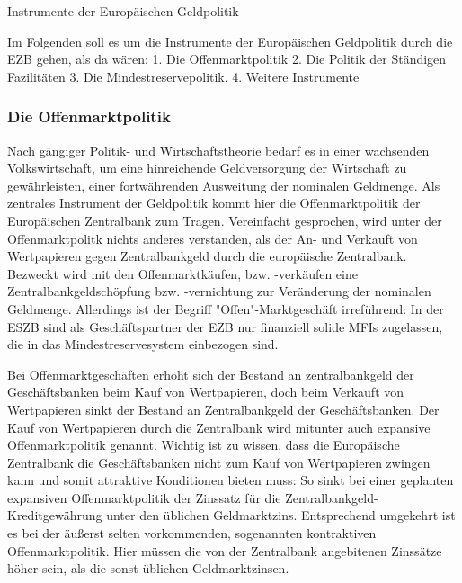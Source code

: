\documentclass[
onecolumn,
a4paper,
abstracton,
parskip=half
,final
]{scrartcl}
\begin{document}
Instrumente der Europ{\"a}ischen Geldpolitik

Im Folgenden soll es um die Instrumente der Europ{\"a}ischen Geldpolitik durch die EZB gehen, als da w{\"a}ren:
1. Die Offenmarktpolitik
2. Die Politik der St{\"a}ndigen Fazilit{\"a}ten
3. Die Mindestreservepolitik.
4. Weitere Instrumente

\subsubsection{Die Offenmarktpolitik}
Nach g{\"a}ngiger Politik- und Wirtschaftstheorie bedarf es in einer wachsenden Volkswirtschaft, um eine hinreichende Geldversorgung der Wirtschaft zu gew{\"a}hrleisten, einer fortw{\"a}hrenden Ausweitung der nominalen Geldmenge. Als zentrales Instrument der Geldpolitik kommt hier die Offenmarktpolitik der Europ{\"a}ischen Zentralbank zum Tragen.
Vereinfacht gesprochen, wird unter der Offenmarktpolitk nichts anderes verstanden, als der An- und Verkauft von Wertpapieren gegen Zentralbankgeld durch die europ{\"a}ische Zentralbank. Bezweckt wird mit den Offenmarktk{\"a}ufen, bzw. -verk{\"a}ufen eine Zentralbankgeldsch{\"o}pfung bzw. -vernichtung zur Ver{\"a}nderung der nominalen Geldmenge. Allerdings ist der Begriff "Offen"-Marktgesch{\"a}ft irref{\"u}hrend: In der ESZB sind als Gesch{\"a}ftspartner der EZB nur finanziell solide MFIs zugelassen, die in das Mindestreservesystem einbezogen sind.

Bei Offenmarktgesch{\"a}ften erh{\"o}ht sich der Bestand an zentralbankgeld der Gesch{\"a}ftsbanken beim Kauf von Wertpapieren, doch beim Verkauft von Wertpapieren sinkt der Bestand an Zentralbankgeld der Gesch{\"a}ftsbanken. Der Kauf von Wertpapieren durch die Zentralbank wird mitunter auch expansive Offenmarktpolitik genannt.
Wichtig ist zu wissen, dass die Europ{\"a}ische Zentralbank die Gesch{\"a}ftsbanken nicht zum Kauf von Wertpapieren zwingen kann und somit attraktive Konditionen bieten muss: So sinkt bei einer geplanten expansiven Offenmarktpolitik der Zinssatz f{\"u}r die Zentralbankgeld-Kreditgew{\"a}hrung unter den {\"u}blichen Geldmarktzins. Entsprechend umgekehrt ist es bei der {\"a}ußerst selten vorkommenden, sogenannten kontraktiven Offenmarktpolitik. Hier m{\"u}ssen die von der Zentralbank angebitenen Zinss{\"a}tze h{\"o}her sein, als die sonst {\"u}blichen Geldmarktzinsen.
\end{document}
